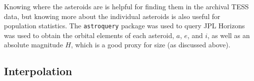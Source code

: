 \documentclass{UCreport}
\begin{document}
Knowing where the asteroids are is helpful for finding them in the archival TESS data, but knowing more about the individual asteroids is also useful for population statistics.
The \texttt{astroquery} \citep{Ginsburg2019} package was used to query JPL Horizons%
was used to obtain the orbital elements of each asteroid, $a$, $e$, and $i$, as well as an absolute magnitude $H$, which is a good proxy for size (as discussed above). %



\subsection{Interpolation}\label{SubSec:Interp}
\end{document}
